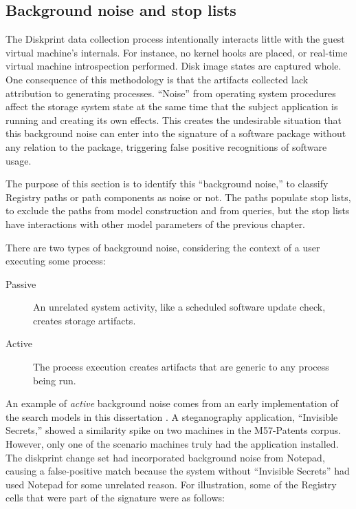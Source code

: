 \documentclass[11pt]{ucthesis}
\theoremstyle{plain}
\theoremstyle{definition}
\begin{document}
\subsection{Background noise and stop lists}
\label{sec:backgroundnoise}

The Diskprint data collection process intentionally interacts little with the guest virtual machine's internals.  For instance, no kernel hooks are placed, or real-time virtual machine introspection \cite{barham:sosp03,hu:osdfcon14} performed.  Disk image states are captured whole.  One consequence of this methodology is that the artifacts collected lack attribution to generating processes.  ``Noise'' from operating system procedures affect the storage system state at the same time that the subject application is running and creating its own effects.  This creates the undesirable situation that this background noise can enter into the signature of a software package without any relation to the package, triggering false positive recognitions of software usage.

The purpose of this section is to identify this ``background noise,'' to classify Registry paths or path components as noise or not.  The paths populate stop lists, to exclude the paths from model construction and from queries, but the stop lists have interactions with other model parameters of the previous chapter.

There are two types of background noise, considering the context of a user executing some process:

\begin{description}
\item[Passive] An unrelated system activity, like a scheduled software update check, creates storage artifacts.
\item[Active] The process execution creates artifacts that are generic to any process being run.
\end{description}

An example of \emph{active} background noise comes from an early implementation of the search models in this dissertation \cite{nelson:aafs14}.  A steganography application, ``Invisible Secrets,'' showed a similarity spike on two machines in the M57-Patents \cite{woods:adfsl11} corpus.  However, only one of the scenario machines truly had the application installed.  The diskprint change set had incorporated background noise from Notepad, causing a false-positive match because the system without ``Invisible Secrets'' had used Notepad for some unrelated reason.  For illustration, some of the Registry cells that were part of the signature were as follows:
\end{document}
